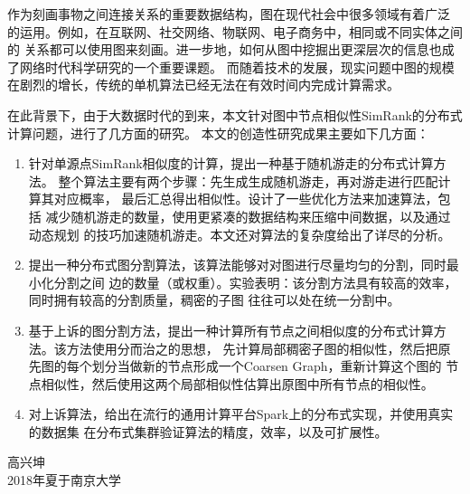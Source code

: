 \documentclass[master]{njuthesis}
\begin{document}
%
\begin{preface}

作为刻画事物之间连接关系的重要数据结构，图在现代社会中很多领域有着广泛
的运用。例如，在互联网、社交网络、物联网、电子商务中，相同或不同实体之间的
关系都可以使用图来刻画。进一步地，如何从图中挖掘出更深层次的信息也成了网络时代科学研究的一个重要课题。
而随着技术的发展，现实问题中图的规模在剧烈的增长，传统的单机算法已经无法在有效时间内完成计算需求。

在此背景下，由于大数据时代的到来，本文针对图中节点相似性SimRank的分布式计算问题，进行了几方面的研究。
本文的创造性研究成果主要如下几方面：

\begin{enumerate}
\item 针对单源点SimRank相似度的计算，提出一种基于随机游走的分布式计算方法。
整个算法主要有两个步骤：先生成生成随机游走，再对游走进行匹配计算其对应概率，
最后汇总得出相似性。设计了一些优化方法来加速算法，包括
减少随机游走的数量，使用更紧凑的数据结构来压缩中间数据，以及通过动态规划
的技巧加速随机游走。本文还对算法的复杂度给出了详尽的分析。

\item 提出一种分布式图分割算法，该算法能够对对图进行尽量均匀的分割，同时最小化分割之间
边的数量（或权重）。实验表明：该分割方法具有较高的效率，同时拥有较高的分割质量，稠密的子图
往往可以处在统一分割中。

\item 基于上诉的图分割方法，提出一种计算所有节点之间相似度的分布式计算方法。该方法使用分而治之的思想，
先计算局部稠密子图的相似性，然后把原先图的每个划分当做新的节点形成一个Coarsen Graph，重新计算这个图的
节点相似性，然后使用这两个局部相似性估算出原图中所有节点的相似性。

\item 对上诉算法，给出在流行的通用计算平台Spark上的分布式实现，并使用真实的数据集
在分布式集群验证算法的精度，效率，以及可扩展性。

\end{enumerate}


\vspace{1cm}
\begin{flushright}
高兴坤\\
2018年夏于南京大学
\end{flushright}

\end{preface}

\tableofcontents
\end{document}
